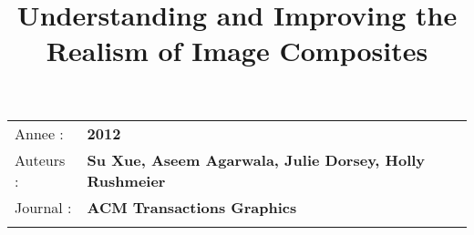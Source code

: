 \documentclass[10pt]{article}
\begin{document}
\title{Understanding and Improving the Realism of Image Composites}
\maketitle

\begin{longtable}[c]{@{}ll@{}}
\toprule\addlinespace

Annee : & \textbf{2012}
\\\addlinespace

Auteurs : & \textbf{Su Xue, Aseem Agarwala, Julie Dorsey, Holly Rushmeier}
\\\addlinespace

Journal : & \textbf{ACM Transactions Graphics}
\\\addlinespace

\bottomrule
\end{longtable}
\end{document}
